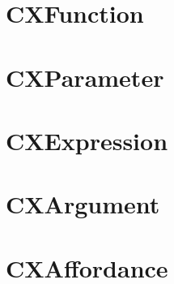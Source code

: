 \section{CXFunction}
\label{cxfunction}

\section{CXParameter}
\label{cxparameter}

\section{CXExpression}
\label{cxexpression}

\section{CXArgument}
\label{cxargument}

\section{CXAffordance}
\label{cxexpression}
